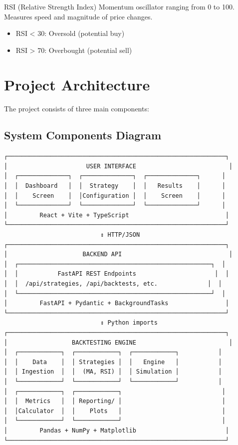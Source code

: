 \documentclass[11pt,a4paper]{article}
\begin{document}
\begin{keyterm}{RSI (Relative Strength Index)}
Momentum oscillator ranging from 0 to 100. Measures speed and magnitude of price changes.
\begin{itemize}
  \item RSI < 30: Oversold (potential buy)
  \item RSI > 70: Overbought (potential sell)
\end{itemize}
\end{keyterm}

\section{Project Architecture}

The project consists of three main components:

\subsection{System Components Diagram}

\begin{verbatim}
┌─────────────────────────────────────────────────────────────┐
│                      USER INTERFACE                          │
│  ┌──────────────┐  ┌──────────────┐  ┌──────────────┐      │
│  │  Dashboard   │  │  Strategy    │  │   Results    │      │
│  │    Screen    │  │Configuration │  │    Screen    │      │
│  └──────────────┘  └──────────────┘  └──────────────┘      │
│         React + Vite + TypeScript                           │
└─────────────────────────────────────────────────────────────┘
                           ↕ HTTP/JSON
┌─────────────────────────────────────────────────────────────┐
│                     BACKEND API                              │
│  ┌──────────────────────────────────────────────────────┐  │
│  │           FastAPI REST Endpoints                      │  │
│  │  /api/strategies, /api/backtests, etc.              │  │
│  └──────────────────────────────────────────────────────┘  │
│         FastAPI + Pydantic + BackgroundTasks                │
└─────────────────────────────────────────────────────────────┘
                           ↕ Python imports
┌─────────────────────────────────────────────────────────────┐
│                  BACKTESTING ENGINE                          │
│  ┌────────────┐  ┌────────────┐  ┌────────────┐           │
│  │    Data    │  │ Strategies │  │   Engine   │           │
│  │ Ingestion  │  │  (MA, RSI) │  │ Simulation │           │
│  └────────────┘  └────────────┘  └────────────┘           │
│  ┌────────────┐  ┌────────────┐                            │
│  │  Metrics   │  │ Reporting/ │                            │
│  │Calculator  │  │    Plots   │                            │
│  └────────────┘  └────────────┘                            │
│         Pandas + NumPy + Matplotlib                         │
└─────────────────────────────────────────────────────────────┘
\end{verbatim}
\end{document}
